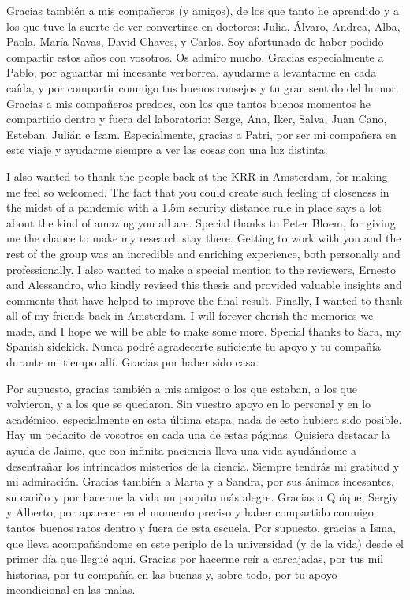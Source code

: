 \begin{acknowledgementslong}
Gracias también a mis compañeros (y amigos), de los que tanto he aprendido y a los que tuve la suerte de ver convertirse en doctores: Julia, Álvaro, Andrea, Alba, Paola, María Navas, David Chaves, y Carlos. Soy afortunada de haber podido compartir estos años con vosotros. Os admiro mucho. Gracias especialmente a Pablo, por aguantar mi incesante verborrea, ayudarme a levantarme en cada caída, y por compartir conmigo tus buenos consejos y tu gran sentido del humor. Gracias a mis compañeros predocs, con los que tantos buenos momentos he compartido dentro y fuera del laboratorio: Serge, Ana, Iker, Salva, Juan Cano, Esteban, Julián e Isam. Especialmente, gracias a Patri, por ser mi compañera en este viaje y ayudarme siempre a ver las cosas con una luz distinta.


I also wanted to thank the people back at the KRR in Amsterdam, for making me feel so welcomed. The fact that you could create such feeling of closeness in the midst of a pandemic with a 1.5m security distance rule in place says a lot about the kind of amazing you all are. Special thanks to Peter Bloem, for giving me the chance to make my research stay there. Getting to work with you and the rest of the group was an incredible and enriching experience, both personally and professionally. I also wanted to make a special mention to the reviewers, Ernesto and Alessandro, who kindly revised this thesis and provided valuable insights and comments that have helped to improve the final result. Finally, I wanted to thank all of my friends back in Amsterdam. I will forever cherish the memories we made, and I hope we will be able to make some more. Special thanks to Sara, my Spanish sidekick. Nunca podré agradecerte suficiente tu apoyo y tu compañía durante mi tiempo allí. Gracias por haber sido casa.



Por supuesto, gracias también a mis amigos: a los que estaban, a los que volvieron, y a los que se quedaron. Sin vuestro apoyo en lo personal y en lo académico, especialmente en esta última etapa, nada de esto hubiera sido posible. Hay un pedacito de vosotros en cada una de estas páginas. Quisiera destacar la ayuda de Jaime, que con infinita paciencia lleva una vida ayudándome a desentrañar los intrincados misterios de la ciencia. Siempre tendrás mi gratitud y mi admiración. Gracias también a Marta y a Sandra, por sus ánimos incesantes, su cariño y por hacerme la vida un poquito más alegre. Gracias a Quique, Sergiy y Alberto, por aparecer en el momento preciso y haber compartido conmigo tantos buenos ratos dentro y fuera de esta escuela. Por supuesto, gracias a Isma, que lleva acompañándome en este periplo de la universidad (y de la vida) desde el primer día que llegué aquí. Gracias por hacerme reír a carcajadas, por tus mil historias, por tu compañía en las buenas y, sobre todo, por tu apoyo incondicional en las malas.


\end{acknowledgementslong}

